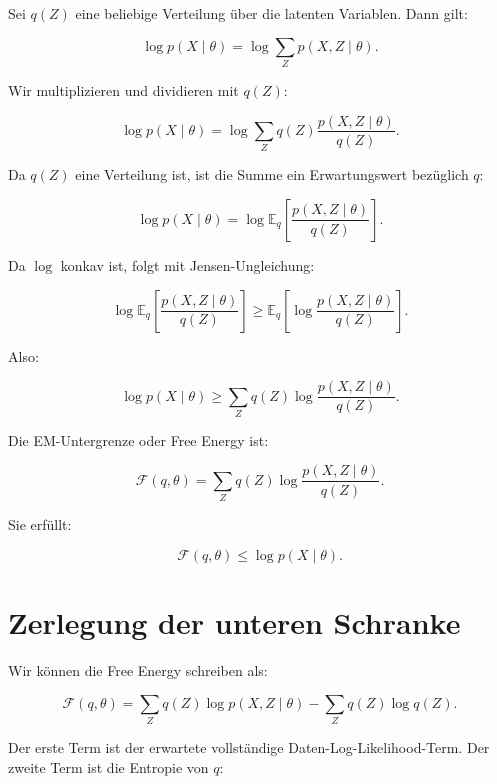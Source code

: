 Sei \(q(Z)\) eine beliebige Verteilung über die latenten Variablen.
Dann gilt:

\[
    \log p(X\mid\theta)
    =
    \log
    \sum_Z
    p(X,Z\mid\theta).
\]

Wir multiplizieren und dividieren mit \(q(Z)\):

\[
    \log p(X\mid\theta)
    =
    \log
    \sum_Z
    q(Z)
    \frac{
        p(X,Z\mid\theta)
    }{
        q(Z)
    }.
\]

Da \(q(Z)\) eine Verteilung ist, ist die Summe ein Erwartungswert bezüglich \(q\):

\[
    \log p(X\mid\theta)
    =
    \log
    \mathbb{E}_{q}
    \left[
        \frac{
            p(X,Z\mid\theta)
        }{
            q(Z)
        }
    \right].
\]

Da \(\log\) konkav ist, folgt mit Jensen-Ungleichung:

\[
    \log
    \mathbb{E}_{q}
    \left[
        \frac{
            p(X,Z\mid\theta)
        }{
            q(Z)
        }
    \right]
    \geq
    \mathbb{E}_{q}
    \left[
        \log
        \frac{
            p(X,Z\mid\theta)
        }{
            q(Z)
        }
    \right].
\]

Also:

\[
    \log p(X\mid\theta)
    \geq
    \sum_Z
    q(Z)
    \log
    \frac{
        p(X,Z\mid\theta)
    }{
        q(Z)
    }.
\]

\begin{definitionbox}
Die EM-Untergrenze oder Free Energy ist:

\[
    \mathcal{F}(q,\theta)
    =
    \sum_Z
    q(Z)
    \log
    \frac{
        p(X,Z\mid\theta)
    }{
        q(Z)
    }.
\]

Sie erfüllt:

\[
    \mathcal{F}(q,\theta)
    \leq
    \log p(X\mid\theta).
\]
\end{definitionbox}

\section{Zerlegung der unteren Schranke}

Wir können die Free Energy schreiben als:

\[
    \mathcal{F}(q,\theta)
    =
    \sum_Z
    q(Z)
    \log p(X,Z\mid\theta)
    -
    \sum_Z
    q(Z)
    \log q(Z).
\]

Der erste Term ist der erwartete vollständige Daten-Log-Likelihood-Term.
Der zweite Term ist die Entropie von \(q\):

